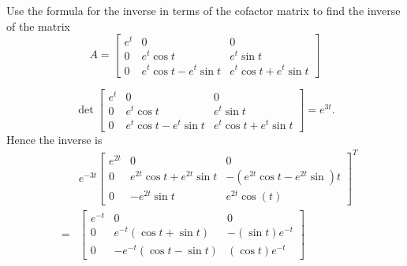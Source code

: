 \documentclass{ximera}
\begin{document}
\begin{problem}\label{prb:7.38} Use the formula for the inverse in terms of the cofactor matrix to
find the inverse of the matrix
\begin{equation*}
A=\left[
\begin{array}{ccc}
e^{t} & 0 & 0 \\
0 & e^{t}\cos t & e^{t}\sin t \\
0 & e^{t}\cos t-e^{t}\sin t & e^{t}\cos t+e^{t}\sin t
\end{array}
\right]
\end{equation*}
\begin{hint}
\[
\det \left[
\begin{array}{ccc}
e^{t} & 0 & 0 \\
0 & e^{t}\cos t & e^{t}\sin t \\
0 & e^{t}\cos t-e^{t}\sin t & e^{t}\cos t+e^{t}\sin t
\end{array}
\right] = e^{3t}.
\]
Hence the inverse is
\begin{eqnarray*}
&&e^{-3t}\left[
\begin{array}{ccc}
e^{2t} & 0 & 0 \\
0 & e^{2t}\cos t+e^{2t}\sin t & -\left( e^{2t}\cos t-e^{2t}\sin \right) t \\
0 & -e^{2t}\sin t & e^{2t}\cos \left( t\right)
\end{array}
\right] ^{T} \\
&=& \left[
\begin{array}{ccc}
e^{-t} & 0 & 0 \\
0 & e^{-t}\left( \cos t+\sin t\right)  & -\left( \sin t\right) e^{-t} \\
0 & -e^{-t}\left( \cos t-\sin t\right)  & \left( \cos t\right) e^{-t}
\end{array}
\right]
\end{eqnarray*}
\end{hint}
\end{problem}
\end{document}
